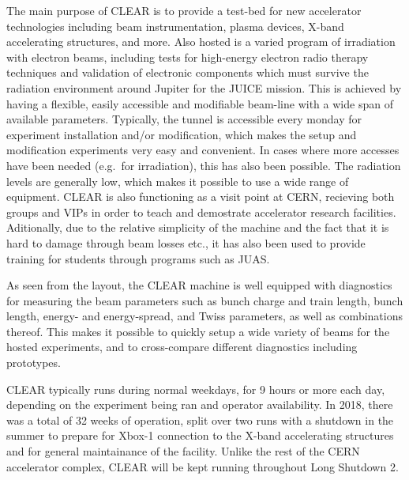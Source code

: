 \documentclass[a4paper,
               keeplastbox,   %
               ]{jacow}
\begin{document}
The main purpose of CLEAR is to provide a test-bed for new accelerator technologies including beam instrumentation, plasma devices, X-band accelerating structures, and more.
Also hosted is a varied program of irradiation with electron beams, including tests for high-energy electron radio therapy techniques and validation of electronic components which must survive the radiation environment around Jupiter for the JUICE mission.
This is achieved by having a flexible, easily accessible and modifiable beam-line with a wide span of available parameters.
Typically, the tunnel is accessible every monday for experiment installation and/or modification, which makes the setup and modification experiments very easy and convenient.
In cases where more accesses have been needed (e.g.\ for irradiation), this has also been possible.
The radiation levels are generally low, which makes it possible to use a wide range of equipment.
CLEAR is also functioning as a visit point at CERN, recieving both groups and VIPs in order to teach and demostrate accelerator research facilities.
Aditionally, due to the relative simplicity of the machine and the fact that it is hard to damage through beam losses etc., it has also been used to provide training for students through programs such as JUAS.

As seen from the layout, the CLEAR machine is well equipped with diagnostics for measuring the beam parameters such as bunch charge and train length, bunch length, energy- and energy-spread, and Twiss parameters, as well as combinations thereof.
This makes it possible to quickly setup a wide variety of beams for the hosted experiments, and to cross-compare different diagnostics including prototypes.

CLEAR typically runs during normal weekdays, for 9 hours or more each day, depending on the experiment being ran and operator availability.
In 2018, there was a total of 32 weeks of operation, split over two runs with a shutdown in the summer to prepare for Xbox-1 connection to the X-band accelerating structures and for general maintainance of the facility.
Unlike the rest of the CERN accelerator complex, CLEAR will be kept running throughout Long Shutdown 2.
\end{document}
